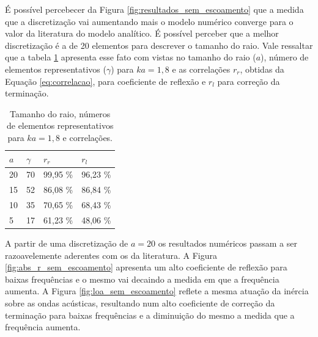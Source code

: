 É possível percebecer da Figura \ref{fig:resultados_sem_escoamento} que a medida que a discretização vai aumentando mais o modelo numérico converge para o valor da literatura do modelo analítico. É possível perceber que a melhor discretização é a de 20 elementos para descrever o tamanho do raio. Vale ressaltar que a tabela \ref{table:discretizacao} apresenta esse fato com vistas no tamanho do raio ($a$), número de elementos representativos ($\gamma$) para $ka = 1,8$ e as correlações $r_r$, obtidas da Equação \ref{eq:correlacao}, para coeficiente de reflexão e $r_l$ para correção da terminação.    

\begin{table}[ht!]
\centering
\caption{Tamanho do raio, números de elementos representativos para $ka = 1,8$ e correlações.}
\label{table:discretizacao}
    \begin{tabular}{|l|l|l|l|}
        \hline
        $a$ & $\gamma$ & $r_r$ & $r_l$ \\ \hline
        20  & 70 & 99,95 \%  & 96,23 \%  \\ \hline
        15  & 52 &  86,08 \% & 86,84 \% \\ \hline
        10  & 35 &  70,65 \% & 68,43 \% \\ \hline
        5   & 17 &  61,23 \% & 48,06 \%  \\
        \hline
    \end{tabular}
\end{table}

A partir de uma discretização de $a = 20$ os resultados numéricos passam a ser razoavelemente aderentes com os da literatura. A Figura \ref{fig:abs_r_sem_escoamento} apresenta um alto coeficiente de reflexão para baixas frequências e o mesmo vai decaindo a medida em que a frequência aumenta. A Figura \ref{fig:loa_sem_escoamento} reflete a mesma atuação da inércia sobre as ondas acústicas, resultando num alto coeficiente de correção da terminação para baixas frequências e a diminuição do mesmo a medida que a frequência aumenta.       














